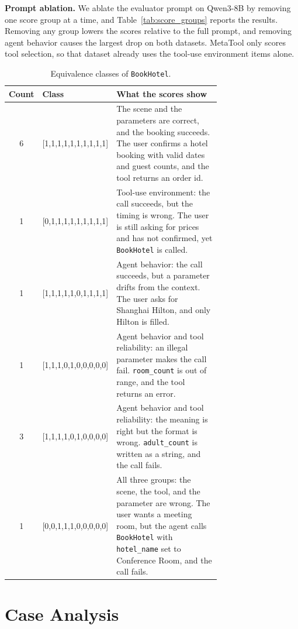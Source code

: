 \documentclass[11pt]{article}
\begin{document}
\textbf{Prompt ablation.}
We ablate the evaluator prompt on Qwen3-8B by removing one score group at a time, and Table~\ref{tab:score_groups} reports the results. Removing any group lowers the scores 
relative to the full prompt, and removing agent behavior causes the largest drop on 
both datasets. MetaTool only scores tool selection, so that dataset already uses the 
tool-use environment items alone.


\begin{table}[t]
\centering
\caption{Equivalence classes of \texttt{BookHotel}.}
\label{tab:bookhotel}
\small
\begin{tabular}{clp{0.72\linewidth}}
\toprule
\textbf{Count} & \textbf{Class} & \textbf{What the scores show} \\
\midrule
6 & [1,1,1,1,1,1,1,1,1,1] & The scene and the parameters are correct, and the booking succeeds. The user confirms a hotel booking with valid dates and guest counts, and the tool returns an order id. \\
1 & [0,1,1,1,1,1,1,1,1,1] & Tool-use environment: the call succeeds, but the timing is wrong. The user is still asking for prices and has not confirmed, yet \texttt{BookHotel} is called. \\
1 & [1,1,1,1,1,0,1,1,1,1] & Agent behavior: the call succeeds, but a parameter drifts from the context. The user asks for Shanghai Hilton, and only Hilton is filled. \\
1 & [1,1,1,0,1,0,0,0,0,0] & Agent behavior and tool reliability: an illegal parameter makes the call fail. \texttt{room\_count} is out of range, and the tool returns an error. \\
3 & [1,1,1,1,0,1,0,0,0,0] & Agent behavior and tool reliability: the meaning is right but the format is wrong. \texttt{adult\_count} is written as a string, and the call fails. \\
1 & [0,0,1,1,1,0,0,0,0,0] & All three groups: the scene, the tool, and the parameter are wrong. The user wants a meeting room, but the agent calls \texttt{BookHotel} with \texttt{hotel\_name} set to Conference Room, and the call fails. \\
\bottomrule
\end{tabular}
\end{table}


\section{Case Analysis}\label{case}
\end{document}
